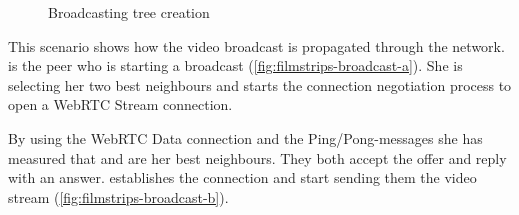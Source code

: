 \begin{figure}[htb!]
	\caption{Broadcasting tree creation}
\label{fig:filmstrips-broadcast}
\end{figure}

This scenario shows how the video broadcast is propagated through the network. \claire is the peer who is starting a broadcast (\vref{fig:filmstrips-broadcast-a}). 
She is selecting her two best neighbours and starts the connection negotiation process to open a WebRTC Stream connection. 

By using the WebRTC Data connection and the Ping/Pong-messages she has measured that \alice and \bob are her best neighbours. They both accept the offer and reply with an answer. \claire establishes the connection and start sending them the video stream (\vref{fig:filmstrips-broadcast-b}).

